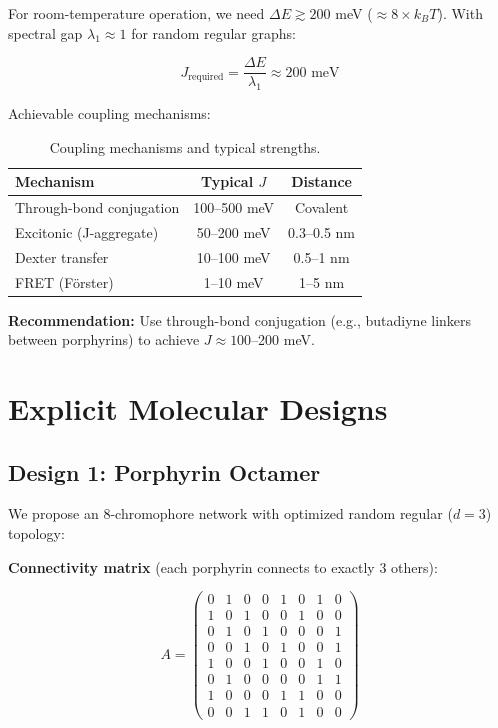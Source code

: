 \documentclass[11pt,a4paper]{article}
\theoremstyle{plain}
\theoremstyle{definition}
\theoremstyle{remark}
\begin{document}
For room-temperature operation, we need $\Delta E \gtrsim 200$ meV ($\approx 8 \times k_B T$). With spectral gap $\lambda_1 \approx 1$ for random regular graphs:

\begin{equation}
J_{\text{required}} = \frac{\Delta E}{\lambda_1} \approx 200 \text{ meV}
\end{equation}

Achievable coupling mechanisms:

\begin{table}[H]
\centering
\begin{tabular}{@{}lcc@{}}
\toprule
\textbf{Mechanism} & \textbf{Typical $J$} & \textbf{Distance} \\
\midrule
Through-bond conjugation & 100--500 meV & Covalent \\
Excitonic (J-aggregate) & 50--200 meV & 0.3--0.5 nm \\
Dexter transfer & 10--100 meV & 0.5--1 nm \\
FRET (F\"orster) & 1--10 meV & 1--5 nm \\
\bottomrule
\end{tabular}
\caption{Coupling mechanisms and typical strengths.}
\label{tab:coupling}
\end{table}

\textbf{Recommendation:} Use through-bond conjugation (e.g., butadiyne linkers between porphyrins) to achieve $J \approx 100$--200 meV.

\section{Explicit Molecular Designs}

\subsection{Design 1: Porphyrin Octamer}

We propose an 8-chromophore network with optimized random regular ($d=3$) topology:

\textbf{Connectivity matrix} (each porphyrin connects to exactly 3 others):

\begin{equation}
A = \begin{pmatrix}
0 & 1 & 0 & 0 & 1 & 0 & 1 & 0 \\
1 & 0 & 1 & 0 & 0 & 1 & 0 & 0 \\
0 & 1 & 0 & 1 & 0 & 0 & 0 & 1 \\
0 & 0 & 1 & 0 & 1 & 0 & 0 & 1 \\
1 & 0 & 0 & 1 & 0 & 0 & 1 & 0 \\
0 & 1 & 0 & 0 & 0 & 0 & 1 & 1 \\
1 & 0 & 0 & 0 & 1 & 1 & 0 & 0 \\
0 & 0 & 1 & 1 & 0 & 1 & 0 & 0
\end{pmatrix}
\end{equation}
\end{document}
